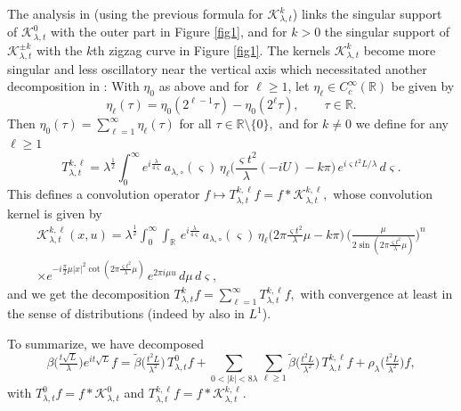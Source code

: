 \documentclass[leqno]{amsart}
\theoremstyle{definition}
\theoremstyle{remark}
\numberwithin{equation}{section}
\newcommand{\R}{\mathbb{R}}
\newcommand\la{{\lambda}}
\newcommand\bbR{{\mathbb {R}}}
\newcommand\sK{{\mathscr {K}}}
\begin{document}
The analysis in \cite{MuellerSeeger2015} (using the previous formula for $\sK^k_{\la,t}$) links the singular support of $\sK^0_{\la,t}$ with the outer part in Figure \ref{fig1}, and for $k>0$  the singular support of  $\sK^{\pm k}_{\la,t}$ 
with the $k$th zigzag curve in Figure \ref{fig1}. The kernels $\sK^k_{\la,t}$  become more singular and less oscillatory near the vertical axis which necessitated another decomposition in \cite{MuellerSeeger2015}:
With $\eta_0$ as above and for $\ell\ge 1$,  let $\eta_\ell\in C_c^{\infty}(\R)$ be given  by 
\begin{equation}\label{eq:eta-ell-def}
 \eta_\ell(\tau) = \eta_{0}(2^{\ell-1} \tau)-\eta_{0}(2^{\ell} \tau),\qquad \tau\in \bbR.
\end{equation}
Then $\eta_{0}(\tau) = \sum_{\ell = 1}^{\infty} \eta_\ell(\tau)$ for all $\tau \in\R\setminus\{ 0\},$  and for $k\neq 0$  we  define for any $\ell\ge 1$
\begin{equation}\label{eq:Tlakl-def} 
T_{\lambda,t}^{k,\ell} = \lambda^{\frac 12} \int_0^\infty e^{i \frac{\lambda}{ 4 \varsigma}} \, a_{\lambda,\circ}(\varsigma) \, \eta_\ell\Big(\frac{\varsigma t^2}{\lambda}(-iU)-k \pi\Big) \, e^{i \varsigma t^2 L / \lambda} \, d\varsigma.
\end{equation}
This defines 
a convolution operator $f\mapsto T_{\lambda,t}^{k,\ell}f=f*\sK_{\la,t}^{k,\ell},$ whose convolution kernel is given  by 
\begin{multline}
\sK_{\la,t}^{k,\ell} (x,u)=\lambda^{\frac 12}  \int_0^\infty \int_\R \, e^{i \frac{\lambda}{ 4 \varsigma}}\,  a_{\lambda,\circ}(\varsigma) \, \eta_\ell\big(2\pi\tfrac{\varsigma t^2 }{\lambda}\mu-k \pi\big)\, \Big(\frac {\mu}{2\sin (2\pi \frac{\varsigma t^2}{\lambda}\mu)}\Big)^{n}\\
\times e^{-i\frac {\pi}2 \mu |x|^2\cot(2\pi \frac{\varsigma t^2}{\lambda} \mu) } 
  \, e^{2\pi i\mu u} \,d\mu\, d\varsigma,    \label{Kkllat}
\end{multline}
and we get the  decomposition 
$
T^k_{\la,t}f=\sum_{\ell=1}^\infty T_{\la,t}^{k,\ell}f,
$
with convergence at least in the sense of distributions (indeed by \cite{MuellerSeeger2015} also in $L^1$). 
\smallskip

To summarize,  we have decomposed 
\begin{equation}\label{opdecomp}
\beta\big(\tfrac{t\sqrt L}{\la}\big) e^{it\sqrt L }f=\widetilde \beta\big(\tfrac{t^2L}{\la^2}) \,  T^0_{\la,t} f+
\sum_{0<|k|<8\la} \sum_{\ell\ge 1} \widetilde \beta\big(\tfrac{t^2L}{\la^2}) \,  T^{k,\ell}_{\la,t}f+ \rho_\la\big(\tfrac{t^2L}{\la^2}\big)f,
\end{equation}
with $T^{0}_{\la,t}f=f*\sK^{0}_{\la,t}$ and $T^{k,\ell}_{\la,t}f=f*\sK^{k,\ell}_{\la,t}.$
\end{document}
